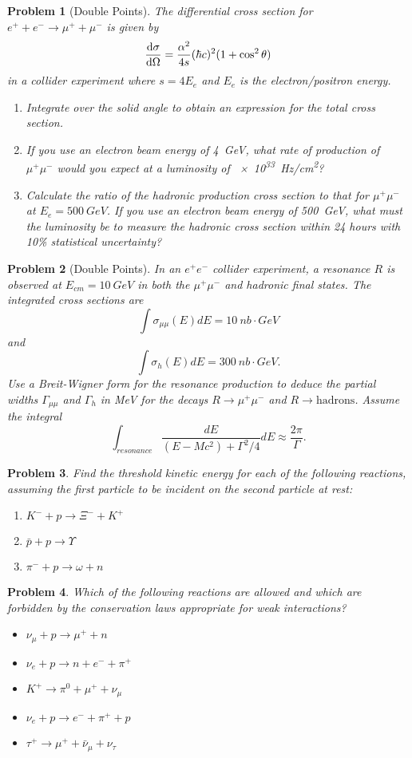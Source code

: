 \documentclass{article}
\newtheorem{plm}{Problem}
\begin{document}
\begin{plm}[Double Points]
  The differential cross section for $e^{+} + e^{-} \to \mu^{+} + \mu^{-}$ is given by
  \[
    \dv{\sigma}{\Omega} = \frac{\alpha^{2}}{4s}(\hbar c)^{2}(1 + \cos^{2}\theta)
  \]
  in a collider experiment where $s = 4E_{e}$ and $E_{e}$ is the electron/positron energy.
  \begin{enumerate}
  \item Integrate over the solid angle to obtain an expression for the total cross section.
  \item If you use an electron beam energy of \SI{4}{GeV}, what rate of production of $\mu^{+}\mu^{-}$ would you expect at a luminosity of
    \SI{e33}{Hz/cm^{2}}?
  \item Calculate the ratio of the hadronic production cross section to that for $\mu^{+}\mu^{-}$ at $E_{e} = \SI{500}{GeV}$.
    If you use an electron beam energy of \SI{500}{GeV}, what must the luminosity be to measure the hadronic cross section within 24 hours
    with 10\% statistical uncertainty?
  \end{enumerate}
\end{plm}
\begin{plm}[Double Points]
  In an $e^{+}e^{-}$ collider experiment, a resonance $R$ is observed at $E_{cm} = \SI{10}{GeV}$ in both the $\mu^{+}\mu^{-}$
  and hadronic final states.
  The integrated cross sections are
  \[
    \int \sigma_{\mu \mu}(E)dE = \SI{10}{nb \cdot GeV}
  \]
  and
  \[
    \int \sigma_{h}(E)dE = \SI{300}{nb \cdot GeV}.
  \]
  Use a Breit-Wigner form for the resonance production to deduce the partial widths $\Gamma_{\mu\mu}$ and $\Gamma_{h}$ in \si{MeV}
  for the decays $R \to \mu^{+}\mu^{-}$ and $R \to \text{hadrons}$.
  Assume the integral
  \[
    \int_{resonance}\frac{dE}{(E - Mc^{2}) + \Gamma^{2}/4}dE \approx \frac{2\pi}{\Gamma}.
  \]
\end{plm}
\begin{plm}
  Find the threshold kinetic energy for each of the following reactions, assuming the first particle to be incident on the second particle
  at rest:
  \begin{enumerate}
  \item $K^{-} + p \to \Xi^{-} + K^{+}$
  \item $\bar{p} + p \to \Upsilon$
  \item $\pi^{-} + p \to \omega + n$
  \end{enumerate}
\end{plm}
\begin{plm}
  Which of the following reactions are allowed and which are forbidden by the conservation laws appropriate for weak interactions?
  \begin{itemize}
  \item $\nu_{\mu} + p \to \mu^{+} + n$
  \item $\nu_{e} + p \to n + e^{-} + \pi^{+}$
  \item $K^{+} \to \pi^{0} + \mu^{+} + \nu_{\mu}$
  \item $\nu_{e} + p \to e^{-} + \pi^{+} + p$
  \item $\tau^{+} \to \mu^{+} + \bar{\nu}_{\mu} + \nu_{\tau}$
  \end{itemize}
\end{plm}
\end{document}
